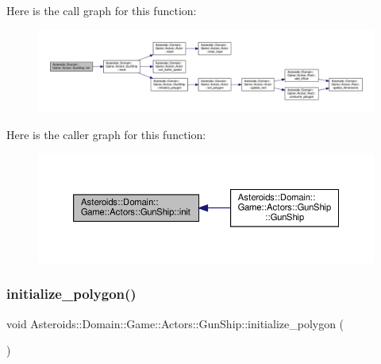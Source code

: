 Here is the call graph for this function\+:\nopagebreak
\begin{figure}[H]
\begin{center}
\leavevmode
\includegraphics[width=350pt]{classAsteroids_1_1Domain_1_1Game_1_1Actors_1_1GunShip_ad5c14269f0503e045f03f265f9019e95_cgraph}
\end{center}
\end{figure}
Here is the caller graph for this function\+:\nopagebreak
\begin{figure}[H]
\begin{center}
\leavevmode
\includegraphics[width=350pt]{classAsteroids_1_1Domain_1_1Game_1_1Actors_1_1GunShip_ad5c14269f0503e045f03f265f9019e95_icgraph}
\end{center}
\end{figure}
\mbox{\label{classAsteroids_1_1Domain_1_1Game_1_1Actors_1_1GunShip_a4947769593f504d4342abcec5a01330b}} 
\subsubsection{\texorpdfstring{initialize\+\_\+polygon()}{initialize\_polygon()}}
{\footnotesize\ttfamily void Asteroids\+::\+Domain\+::\+Game\+::\+Actors\+::\+Gun\+Ship\+::initialize\+\_\+polygon (\begin{DoxyParamCaption}{ }\end{DoxyParamCaption})\hspace{0.3cm}{\ttfamily [private]}}



